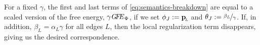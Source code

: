 \documentclass{article}
\begin{document}
	For a fixed $\gamma$, the first and last terms
	of \eqref{eq:semantics-breakdown} are equal to a scaled
	version of the free energy, $\gamma\mathit{G\mkern-4mu F\mkern-4.5mu E}_\Phi$, 
	if we set $\phi_J := \mathbf{p}_{\!_L\!}$ and $\theta_J := \nicefrac{\beta_L}{\gamma}$.  
	If, in addition, $\beta_L = {\alpha_L}\gamma$ for all
	edges $L$, then
	the local regularization term disappears, giving us
	the desired correspondence. 
	
\end{document}
